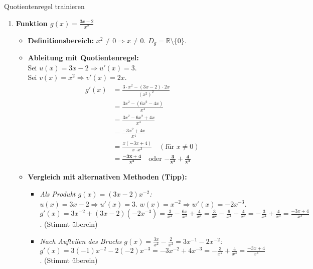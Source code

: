 \begin{loesungsumgebung}{Quotientenregel trainieren}
\begin{enumerate}[label=(\alph*)]
    \item \textbf{Funktion $g(x) = \frac{3x-2}{x^2}$}
    \begin{itemize}
        \item \textbf{Definitionsbereich:} $x^2 \neq 0 \Rightarrow x \neq 0$. $D_g = \mathbb{R} \setminus \{0\}$.
        \item \textbf{Ableitung mit Quotientenregel:} \\
        Sei $u(x) = 3x-2 \Rightarrow u'(x) = 3$. \\
        Sei $v(x) = x^2 \Rightarrow v'(x) = 2x$.
        \begin{align*}
        g'(x) &= \frac{3 \cdot x^2 - (3x-2) \cdot 2x}{(x^2)^2} \\
              &= \frac{3x^2 - (6x^2 - 4x)}{x^4} \\
              &= \frac{3x^2 - 6x^2 + 4x}{x^4} \\
              &= \frac{-3x^2 + 4x}{x^4} \\
              &= \frac{x(-3x + 4)}{x \cdot x^3} \quad (\text{für } x \neq 0) \\
              &= \mathbf{\frac{-3x + 4}{x^3}} \quad \text{oder } \mathbf{-\frac{3}{x^2} + \frac{4}{x^3}}
        \end{align*}
        \item \textbf{Vergleich mit alternativen Methoden (Tipp):}
        \begin{itemize}
            \item \textit{Als Produkt $g(x) = (3x-2)x^{-2}$:} \\
            $u(x)=3x-2 \Rightarrow u'(x)=3$. $w(x)=x^{-2} \Rightarrow w'(x)=-2x^{-3}$.
            $g'(x) = 3x^{-2} + (3x-2)(-2x^{-3}) = \frac{3}{x^2} - \frac{6x}{x^3} + \frac{4}{x^3} = \frac{3}{x^2} - \frac{6}{x^2} + \frac{4}{x^3} = -\frac{3}{x^2} + \frac{4}{x^3} = \frac{-3x+4}{x^3}$. (Stimmt überein)
            \item \textit{Nach Aufteilen des Bruchs $g(x) = \frac{3x}{x^2} - \frac{2}{x^2} = 3x^{-1} - 2x^{-2}$:} \\
            $g'(x) = 3(-1)x^{-2} - 2(-2)x^{-3} = -3x^{-2} + 4x^{-3} = -\frac{3}{x^2} + \frac{4}{x^3} = \frac{-3x+4}{x^3}$. (Stimmt überein)
        \end{itemize}
    \end{itemize}


\end{enumerate}
\end{loesungsumgebung}
